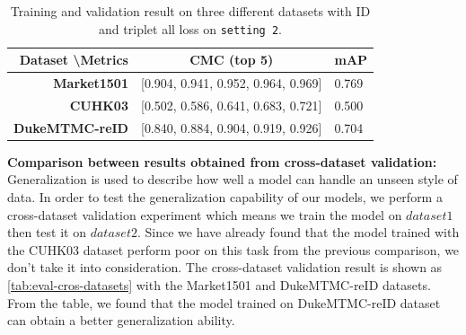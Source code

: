 \begin{table}[]
    \centering
    \begin{tabular}{|r|l|l|}
        \hline
        \textbf{Dataset \textbackslash Metrics} &
        \multicolumn{1}{c|}{\textbf{CMC (top 5)}} &
        \multicolumn{1}{c|}{\textbf{mAP}} \\ \hline
        \textbf{Market1501} & {[}0.904, 0.941, 0.952, 0.964, 0.969{]} & 0.769
        \\ \hline
        \textbf{CUHK03} & {[}0.502, 0.586, 0.641, 0.683, 0.721{]} & 0.500 \\
        \hline
        \textbf{DukeMTMC-reID} & {[}0.840, 0.884, 0.904, 0.919, 0.926{]} &
        0.704 \\ \hline
    \end{tabular}
    \caption{Training and validation result on three different datasets with ID
        and triplet all loss on \texttt{setting 2}.}
    \label{tab:eval-dif-datasets}
\end{table}

\textbf{Comparison between results obtained from cross-dataset validation:}
Generalization is used to describe how well a model can handle an unseen style
of data. In order to test the generalization capability of our models, we
perform a cross-dataset validation experiment which means we train the model on
$dataset1$ then test it on $dataset2$. Since we have already found that the model
trained with the CUHK03 dataset perform poor on this task from the previous
comparison, we don't take it into consideration. The cross-dataset validation
result is shown as \autoref{tab:eval-cros-datasets} with the Market1501 and
DukeMTMC-reID datasets.
From the table, we found that the model trained on DukeMTMC-reID dataset can
obtain a better generalization ability.

\begin{table}[]
    \caption[Cross-dataset validation result between Market1501 and
    DukeMTMC-reID dataset on \texttt{setting 2}]
    {Cross-dataset validation result between Market1501 and DukeMTMC-reID
        dataset on \texttt{setting 2}. M $\rightarrow$ D represents the model
        trained on Market1501 dataset and tested on DukeMTMC-reID dataset.}
    \label{tab:eval-cros-datasets}
\end{table}

